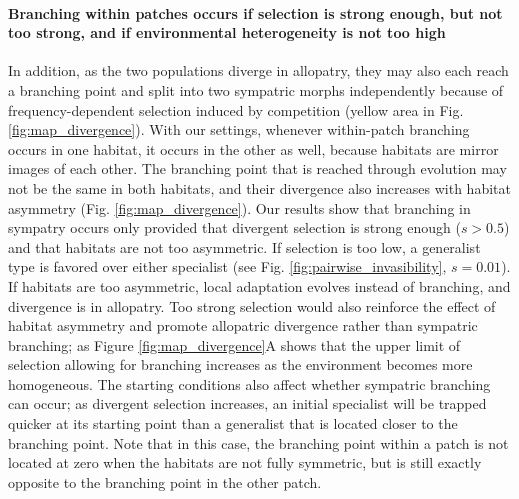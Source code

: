 
\paragraph{Branching within patches occurs if selection is strong enough, but not too strong, and if environmental heterogeneity is not too high} In addition, as the two populations diverge in allopatry, they may also each reach a branching point and split into two sympatric morphs independently because of frequency-dependent selection induced by competition (yellow area in Fig. \ref{fig:map_divergence}). With our settings, whenever within-patch branching occurs in one habitat, it occurs in the other as well, because habitats are mirror images of each other. The branching point that is reached through evolution may not be the same in both habitats, and their divergence also increases with habitat asymmetry (Fig. \ref{fig:map_divergence}). Our results show that branching in sympatry occurs only provided that divergent selection is strong enough ($s > 0.5$) and that habitats are not too asymmetric. If selection is too low, a generalist type is favored over either specialist (see Fig. \ref{fig:pairwise_invasibility}, $s = 0.01$). If habitats are too asymmetric, local adaptation evolves instead of branching, and divergence is in allopatry. Too strong selection would also reinforce the effect of habitat asymmetry and promote allopatric divergence rather than sympatric branching; as Figure \ref{fig:map_divergence}A shows that the upper limit of selection allowing for branching increases as the environment becomes more homogeneous. The starting conditions also affect whether sympatric branching can occur; as divergent selection increases, an initial specialist will be trapped quicker at its starting point than a generalist that is located closer to the branching point. Note that in this case, the branching point within a patch is not located at zero when the habitats are not fully symmetric, but is still exactly opposite to the branching point in the other patch.

